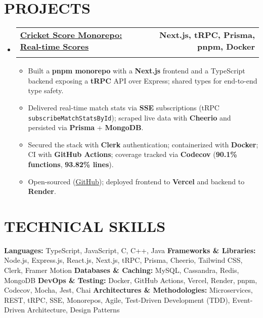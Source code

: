 \documentclass[letterpaper,11pt]{article}
\makeatletter
\newcommand{\resumeSubheading}[4]{
  \vspace{-2pt}\item
    \begin{tabular*}{1.0\textwidth}[t]{l@{\extracolsep{\fill}}r}
      \textbf{\large#1} & \textbf{\small #2} \\
      \textit{\large#3} & \textit{\small #4} \\
    \end{tabular*}\vspace{-7pt}
}
\newcommand{\resumeItem}[1]{
  \item\small{
    {#1 \vspace{-2pt}}
  }
}
\newcommand{\resumeSubHeadingListStart}{\begin{itemize}[leftmargin=0.0in, label={}]}
\newcommand{\resumeSubHeadingListEnd}{\end{itemize}}
\newcommand{\resumeItemListStart}{\begin{itemize}}
\newcommand{\resumeItemListEnd}{\end{itemize}\vspace{-5pt}}
\makeatother
\begin{document}
\section{PROJECTS}
  \resumeSubHeadingListStart
    \resumeSubheading
      {\href{https://cricscore.deveshsangwan.com/}{Cricket Score Monorepo: Real-time Scores \raisebox{-0.1\height}{\faLink}}}{Next.js, tRPC, Prisma, pnpm, Docker}{}{}
      \vspace{-10pt}
    \resumeItemListStart
        \resumeItem{Built a \textbf{pnpm monorepo} with a \textbf{Next.js} frontend and a TypeScript backend exposing a \textbf{tRPC} API over Express; shared types for end-to-end type safety.}
        \resumeItem{Delivered real-time match stats via \textbf{SSE} subscriptions (tRPC \texttt{subscribeMatchStatsById}); scraped live data with \textbf{Cheerio} and persisted via \textbf{Prisma} + \textbf{MongoDB}.}
        \resumeItem{Secured the stack with \textbf{Clerk} authentication; containerized with \textbf{Docker}; CI with \textbf{GitHub Actions}; coverage tracked via \textbf{Codecov} (\textbf{90.1\% functions}, \textbf{93.82\% lines}).}
        \resumeItem{Open-sourced (\href{https://github.com/deveshsangwan/cricketScoreApi}{GitHub}); deployed frontend to \textbf{Vercel} and backend to \textbf{Render}.}
    \resumeItemListEnd
  \resumeSubHeadingListEnd

\section{TECHNICAL SKILLS}
    \small{
    \textbf{Languages:} TypeScript, JavaScript, C, C++, Java \newline
    \textbf{Frameworks \& Libraries:} Node.js, Express.js, React.js, Next.js, tRPC, Prisma, Cheerio, Tailwind CSS, Clerk, Framer Motion \newline
    \textbf{Databases \& Caching:} MySQL, Cassandra, Redis, MongoDB \newline
    \textbf{DevOps \& Testing:} Docker, GitHub Actions, Vercel, Render, pnpm, Codecov, Mocha, Jest, Chai \newline
    \textbf{Architectures \& Methodologies:} Microservices, REST, tRPC, SSE, Monorepos, Agile, Test-Driven Development (TDD), Event-Driven Architecture, Design Patterns
    }

\end{document}
